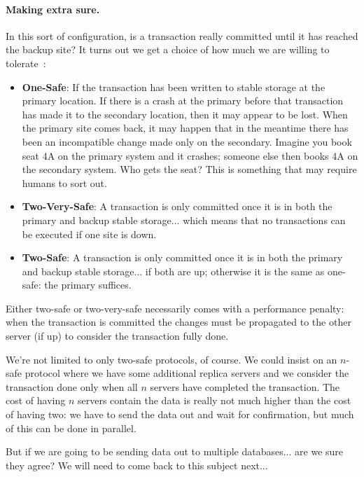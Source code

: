 \paragraph{Making extra sure.} In this sort of configuration, is a transaction really committed until it has reached the backup site? It turns out we get a choice of how much we are willing to tolerate~\cite{dsc}:

\begin{itemize}
	\item \textbf{One-Safe}: If the transaction has been written to stable storage at the primary location. If there is a crash at the primary before that transaction has made it to the secondary location, then it may appear to be lost. When the primary site comes back, it may happen that in the meantime there has been an incompatible change made only on the secondary. Imagine you book seat 4A on the primary system and it crashes; someone else then books 4A on the secondary system. Who gets the seat? This is something that may require humans to sort out.
	\item \textbf{Two-Very-Safe}: A transaction is only committed once it is in both the primary and backup stable storage... which means that no transactions can be executed if one site is down.
	\item \textbf{Two-Safe}: A transaction is only committed once it is in both the primary and backup stable storage... if both are up; otherwise it is the same as one-safe: the primary suffices. 
\end{itemize}

Either two-safe or two-very-safe necessarily comes with a performance penalty: when the transaction is committed the changes must be propagated to the other server (if up) to consider the transaction fully done.

We're not limited to only two-safe protocols, of course. We could insist on an $n$-safe protocol where we have some additional replica servers and we consider the transaction done only when all $n$ servers have completed the transaction. The cost of having $n$ servers contain the data is really not much higher than the cost of having two: we have to send the data out and wait for confirmation, but much of this can be done in parallel.

But if we are going to be sending data out to multiple databases... are we sure they agree? We will need to come back to this subject next...




